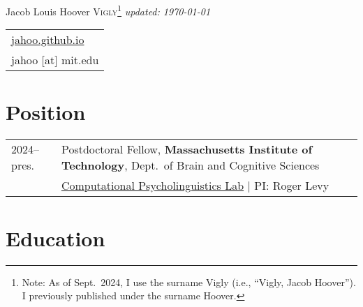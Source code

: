 \documentclass[11pt,a4paper]{article}
\begin{document}
\pagestyle{empty}
\Huge{Jacob Louis Hoover \scshape{Vigly}}\footnote{Note: As of Sept.\ 2024, I use the surname Vigly (i.e., ``Vigly, Jacob Hoover''). I previously published under the surname Hoover.}
\small\textit{\hfill{} updated: \today}

\begin{tabular}{p{\textwidth-12pt}}
  \href{http://jahoo.github.io}{jahoo.github.io}\\
  jahoo [at] mit.edu\\
\end{tabular}

\vspace*{10pt}

\section{Position}

\begin{longtable}{p{1.7cm}|p{15cm}}
  2024--pres.%
    &Postdoctoral Fellow,
    \textbf{Massachusetts Institute of Technology}, Dept.\ of Brain and Cognitive Sciences\\
    &\quad{}\href{https://cpl.mit.edu}{Computational Psycholinguistics Lab} | PI: Roger Levy\\
  \end{longtable}

\section{Education}
\end{document}

